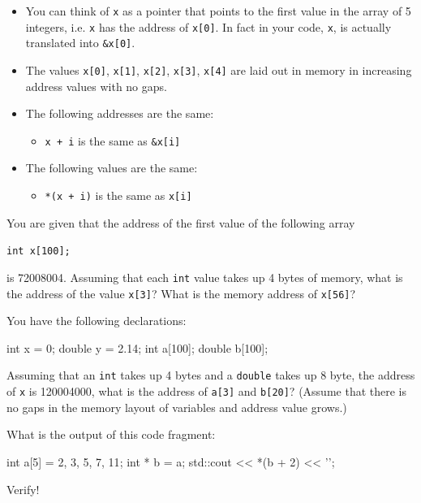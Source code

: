 \begin{itemize}
\item You can think of \texttt{x} as a pointer that points to the first value
  in the array of 5 integers, i.e. \texttt{x} has the address of
  \texttt{x[0]}. In fact in your code, \texttt{x}, is actually
  translated into \texttt{\&x[0]}.
\item The values \texttt{x[0]}, \texttt{x[1]}, \texttt{x[2]},
  \texttt{x[3]}, \texttt{x[4]} are laid out in memory in increasing
  address values with no gaps.
\item The following addresses are the same:
  \begin{itemize}
  \item \texttt{x + i} is the same as \texttt{\&x[i]}
  \end{itemize}
\item The following values are the same:
  \begin{itemize}
  \item \texttt{*(x + i)} is the same as \texttt{x[i]}
  \end{itemize}
\end{itemize}

\begin{ex}
You are given that the address of the first value of
the following array

\verb!int x[100];!

is 72008004. Assuming that each \texttt{int} value takes up 4 bytes of
memory, what is the address of the value \texttt{x[3]}? What is the
memory address of \texttt{x[56]}?
\end{ex}

\begin{ex}
You have the following declarations:

\begin{consolethree}[escapeinside=||]
int x = 0;
double y = 2.14;
int a[100];
double b[100];
\end{consolethree}

Assuming that an \texttt{int} takes up 4 bytes and a \texttt{double} takes
up 8 byte, the address of \texttt{x} is 120004000, what is the address of
\texttt{a[3]} and \texttt{b[20]}? (Assume that there is no gaps in
the memory layout of variables and address value grows.)
\end{ex}

\begin{ex}
What is the output of this code fragment:

\begin{consolethree}[escapeinside=||]
int a[5] = {2, 3, 5, 7, 11};
int * b = a;
std::cout << *(b + 2) << '\n';
\end{consolethree}

Verify!
\end{ex}

